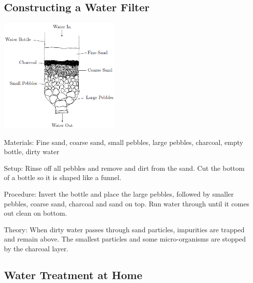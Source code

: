 \begin{multicols}{2}
\columnbreak

\subsection{Constructing a Water Filter}

\begin{center}
\includegraphics[width=0.45\textwidth]{./img/water-filter.png}
\end{center}

\begin{description*}
\item[Materials:]{Fine sand, coarse sand, small pebbles, large pebbles, charcoal, empty bottle, dirty water}
\item[Setup:]{Rinse off all pebbles and remove and dirt from the sand. Cut the bottom of a bottle so it is shaped like a funnel.}
\item[Procedure:]{Invert the bottle and place the large pebbles, followed by smaller pebbles, coarse sand, charcoal and sand on top. Run water through until it comes out clean on bottom.}
\item[Theory:]{When dirty water passes through sand particles, impurities are trapped and
remain above. The smallest particles and some micro-organisms are stopped
by the charcoal layer.}
\end{description*}


\subsection{Water Treatment at Home}


\end{multicols}
